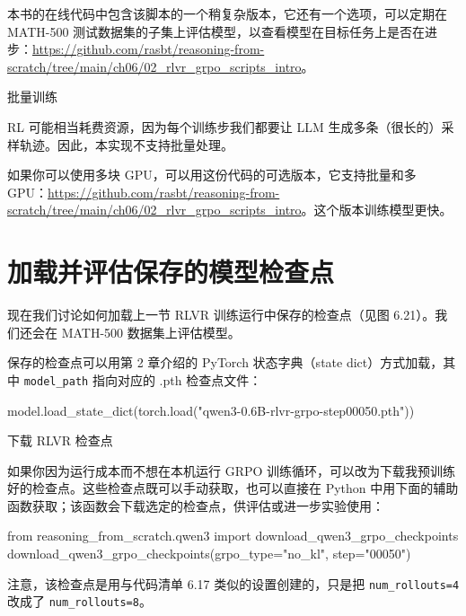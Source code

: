 本书的在线代码中包含该脚本的一个稍复杂版本，它还有一个选项，可以定期在 MATH-500 测试数据集的子集上评估模型，以查看模型在目标任务上是否在进步：\href{https://github.com/rasbt/reasoning-from-scratch/tree/main/ch06/02\_rlvr\_grpo\_scripts\_intro}{https://github.com/rasbt/reasoning-from-scratch/tree/main/ch06/02\_rlvr\_grpo\_scripts\_intro}。

\begin{mySidebar}{批量训练}

RL 可能相当耗费资源，因为每个训练步我们都要让 LLM 生成多条（很长的）采样轨迹。因此，本实现不支持批量处理。

如果你可以使用多块 GPU，可以用这份代码的可选版本，它支持批量和多 GPU：\href{https://github.com/rasbt/reasoning-from-scratch/tree/main/ch06/02\_rlvr\_grpo\_scripts\_intro}{https://github.com/rasbt/reasoning-from-scratch/tree/main/ch06/02\_rlvr\_grpo\_scripts\_intro}。这个版本训练模型更快。

\end{mySidebar}

\section{加载并评估保存的模型检查点}

现在我们讨论如何加载上一节 RLVR 训练运行中保存的检查点（见图 6.21）。我们还会在 MATH-500 数据集上评估模型。


保存的检查点可以用第 2 章介绍的 PyTorch 状态字典（state dict）方式加载，其中 \texttt{model\_path} 指向对应的 .pth 检查点文件：

\begin{codebox}
model.load_state_dict(torch.load("qwen3-0.6B-rlvr-grpo-step00050.pth"))
\end{codebox}

\begin{mySidebar}{下载 RLVR 检查点}

如果你因为运行成本而不想在本机运行 GRPO 训练循环，可以改为下载我预训练好的检查点。这些检查点既可以手动获取，也可以直接在 Python 中用下面的辅助函数获取；该函数会下载选定的检查点，供评估或进一步实验使用：

\begin{codebox}
from reasoning_from_scratch.qwen3 import download_qwen3_grpo_checkpoints
download_qwen3_grpo_checkpoints(grpo_type="no_kl", step="00050")
\end{codebox}

注意，该检查点是用与代码清单 6.17 类似的设置创建的，只是把 \texttt{num\_rollouts=4} 改成了 \texttt{num\_rollouts=8}。

\end{mySidebar}

